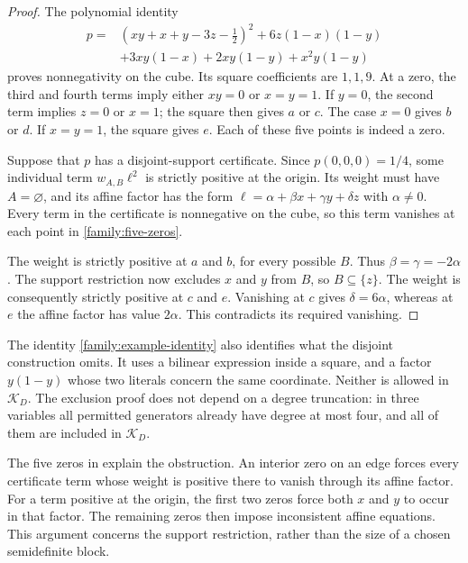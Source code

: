 \begin{proof}
The polynomial identity
\begin{equation}
\label{family:example-identity}
\begin{split}
p={}&(xy+x+y-3z-\tfrac12)^2+6z(1-x)(1-y)\\
   &+3xy(1-x)+2xy(1-y)+x^2y(1-y)
\end{split}
\end{equation}
proves nonnegativity on the cube. Its square coefficients are $1,1,9$.
At a zero, the third and fourth terms imply either $xy=0$ or $x=y=1$.
If $y=0$, the second term implies $z=0$ or $x=1$; the square then gives
$a$ or $c$. The case $x=0$ gives $b$ or $d$. If $x=y=1$, the square gives
$e$. Each of these five points is indeed a zero.

Suppose that $p$ has a disjoint-support certificate. Since
$p(0,0,0)=1/4$, some individual term $w_{A,B}\ell^2$ is strictly positive
at the origin. Its weight must have $A=\varnothing$, and its affine factor
has the form
$\ell=\alpha+\beta x+\gamma y+\delta z$ with $\alpha\ne0$.
Every term in the certificate is nonnegative on the cube, so this term
vanishes at each point in \eqref{family:five-zeros}.

The weight is strictly positive at $a$ and $b$, for every possible $B$.
Thus $\beta=\gamma=-2\alpha$. The support restriction now excludes $x$
and $y$ from $B$, so $B\subseteq\{z\}$. The weight is consequently
strictly positive at $c$ and $e$. Vanishing at $c$ gives
$\delta=6\alpha$, whereas at $e$ the affine factor has value $2\alpha$.
This contradicts its required vanishing.
\end{proof}

The identity \eqref{family:example-identity} also identifies what the
disjoint construction omits. It uses a bilinear expression inside a square,
and a factor $y(1-y)$ whose two literals concern the same coordinate.
Neither is allowed in $\mathcal K_D$. The exclusion proof does not depend
on a degree truncation: in three variables all permitted generators already
have degree at most four, and all of them are included in $\mathcal K_D$.

The five zeros in  explain the obstruction.
An interior zero on an edge forces
every certificate term whose weight is positive there to vanish through
its affine factor. For a term positive at the origin, the first two zeros
force both $x$ and $y$ to occur in that factor. The remaining zeros then
impose inconsistent affine equations. This argument concerns the support
restriction, rather than the size of a chosen semidefinite block.

